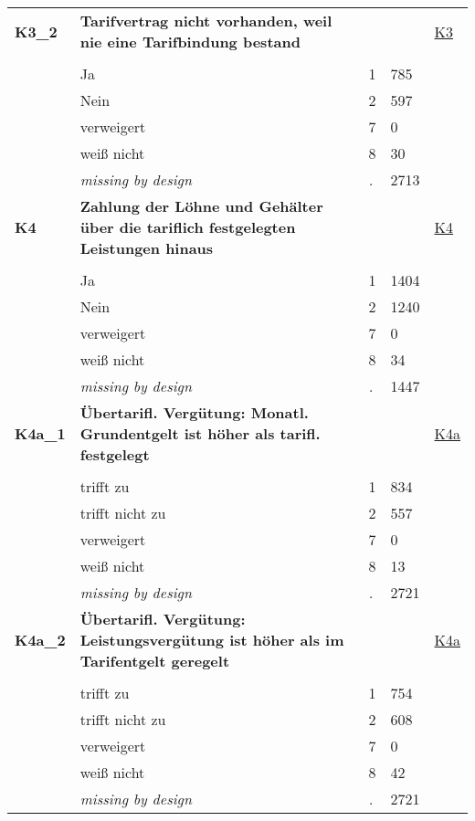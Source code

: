 \begin{longtable}{| L{2.65cm} | L{8cm} | C{1.5cm} | R{1.25cm} | C{2.25cm}  |}
   \midrule
\textbf{K3\_2}\label{var:K3:2} & \textbf{Tarifvertrag nicht vorhanden, weil nie eine Tarifbindung bestand} &  &  & \hyperref[K3]{K3} \\ 
   &  &  &  &  \\ 
   & Ja & 1 & 785 &  \\ 
   & Nein & 2 & 597 &  \\ 
   & verweigert & 7 & 0 &  \\ 
   & weiß nicht & 8 & 30 &  \\ 
   & \textit{missing by design} & \textit{.} & 2713 &  \\ 
   \midrule
\textbf{K4}\label{var:K4} & \textbf{Zahlung der Löhne und Gehälter über die tariflich festgelegten Leistungen hinaus} &  &  & \hyperref[K4]{K4} \\ 
   &  &  &  &  \\ 
   & Ja & 1 & 1404 &  \\ 
   & Nein & 2 & 1240 &  \\ 
   & verweigert & 7 & 0 &  \\ 
   & weiß nicht & 8 & 34 &  \\ 
   & \textit{missing by design} & \textit{.} & 1447 &  \\ 
   \midrule
\textbf{K4a\_1}\label{var:K4a:1} & \textbf{Übertarifl. Vergütung: Monatl. Grundentgelt ist höher als tarifl. festgelegt} &  &  & \hyperref[K4a]{K4a} \\ 
   &  &  &  &  \\ 
   & trifft zu & 1 & 834 &  \\ 
   & trifft nicht zu & 2 & 557 &  \\ 
   & verweigert & 7 & 0 &  \\ 
   & weiß nicht & 8 & 13 &  \\ 
   & \textit{missing by design} & \textit{.} & 2721 &  \\ 
   \midrule
\textbf{K4a\_2}\label{var:K4a:2} & \textbf{Übertarifl. Vergütung: Leistungsvergütung ist höher als im Tarifentgelt geregelt} &  &  & \hyperref[K4a]{K4a} \\ 
   &  &  &  &  \\ 
   & trifft zu & 1 & 754 &  \\ 
   & trifft nicht zu & 2 & 608 &  \\ 
   & verweigert & 7 & 0 &  \\ 
   & weiß nicht & 8 & 42 &  \\ 
   & \textit{missing by design} & \textit{.} & 2721 &  \\ 

\end{longtable}
